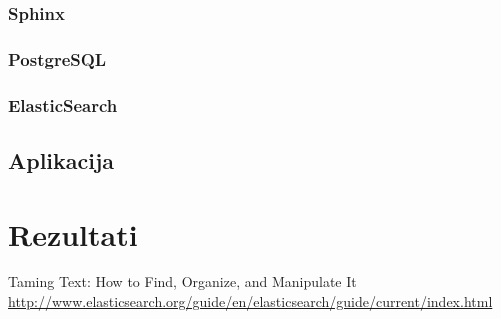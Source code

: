 \documentclass[11pt]{scrreprt}
\begin{document}
\subsection{Sphinx}

\subsection{PostgreSQL}

\subsection{ElasticSearch}

\section{Aplikacija}

\chapter{Rezultati}

\begin{thebibliography}{99}
   Taming Text: How to Find, Organize, and Manipulate It
   \url{http://www.elasticsearch.org/guide/en/elasticsearch/guide/current/index.html}
\end{thebibliography}
\end{document}
